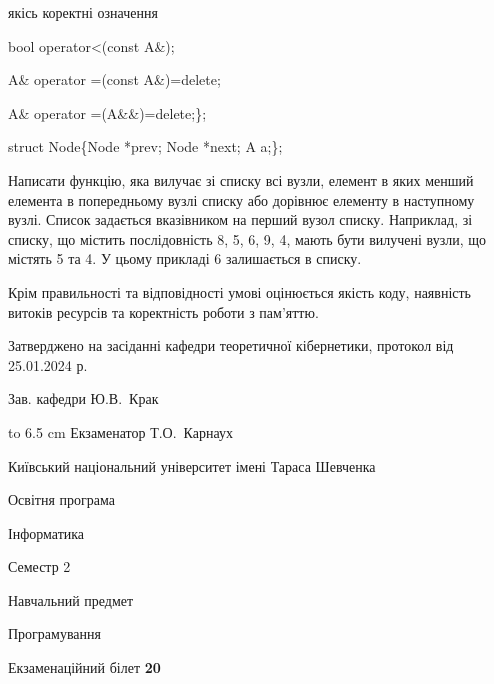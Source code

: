 \documentclass[12pt, ukrainian]{article}
\begin{document}
{\quad  якісь коректні означення 

\quad  bool operator<(const A\&); 

\quad A\& operator =(const A\&)=delete; 

\quad  A\& operator =(A\&\&)=delete;\};

struct Node\{Node *prev; Node *next; A a;\};

Написати функцію, яка вилучає зі списку всі вузли, елемент в яких менший елемента в попередньому вузлі списку або дорівнює елементу в наступному вузлі. Список задається вказівником на перший вузол списку. Наприклад, зі списку, що містить послідовність 8, 5, 6, 9, 4, мають бути вилучені вузли, що містять 5 та 4. У цьому прикладі 6 залишається в списку.

Крім правильності та відповідності умові оцінюється якість коду, наявність витоків ресурсів та коректність роботи з пам'яттю. 

}
{\smallskip\smallskip \begin {scriptsize} Затверджено на засіданні кафедри теоретичної кібернетики, протокол   від   25.01.2024 р.\par\smallskip\smallskip\smallskip\smallskip
{\parbox {6.5 cm} {Зав. кафедри \dotfill Ю.В.~Крак}}\hspace {0.7cm} {\hbox to 6.5 cm { Екзаменатор \dotfill Т.О.~Карнаух}} \end{scriptsize}}
\newpage
{{\begin {scriptsize}\par
{ \center  Київський національний університет імені Тараса Шевченка \par}
{\parbox {5 cm}{Освітня програма \hfill}{\parbox {7 cm}{Інформатика\hfill}}\parbox {6 cm}{\hfill Семестр 2}}\par
{\parbox {5 cm} {Навчальний предмет \hfill}\parbox {7 cm}{Програмування \hfill}\parbox {6cm}{\hfill}\par}\vspace{-15pt} \end{scriptsize}}{\center Екзаменаційний білет \No \textbf { 20 }\par}}
\end{document}
